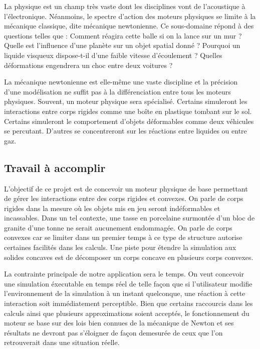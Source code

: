 La physique est un champ très vaste dont les disciplines vont de
l'acoustique à l'électronique. Néanmoins, le spectre d'action des
moteurs physiques se limite à la mécanique classique, dite mécanique
newtonienne. Ce sous-domaine répond à des questions telles que :
Comment réagira cette balle si on la lance sur un mur ? Quelle est
l'influence d'une planète sur un objet spatial donné ? Pourquoi un
liquide visqueux dispose-t-il d'une faible vitesse d'écoulement ?
Quelles déformations engendrera un choc entre deux voitures ?

La mécanique newtonienne est elle-même une vaste discipline et la
précision d'une modélisation ne suffit pas à la différenciation entre
tous les moteurs physiques. Souvent, un moteur physique sera
spécialisé. Certains simuleront les interactions entre corps rigides
comme une boîte en plastique tombant sur le sol. Certains simuleront
le comportement d'objets déformables comme deux véhicules se
percutant. D'autres se concentreront sur les réactions entre liquides
ou entre gaz.

\subsection{Travail à accomplir}

L'objectif de ce projet est de concevoir un moteur physique de base
permettant de gérer les interactions entre des corps rigides et
convexes. On parle de corps rigides dans la mesure o\`u les objets mis
en jeu seront indéformables et incassables. Dans un tel contexte, une
tasse en porcelaine surmontée d'un bloc de granite d'une tonne ne
serait aucunement endommagée. On parle de corps convexes car se
limiter dans un premier temps à ce type de structure autorise
certaines facilités dans les calculs. Une piste pour étendre la
simulation aux solides concaves est de décomposer un corps concave en
plusieurs corps convexes.

La contrainte principale de notre application sera le temps. On veut
concevoir une simulation éxecutable en temps réel de telle façon que
si l'utilisateur modifie l'environnement de la simulation à un instant
quelconque, une réaction à cette interaction soit immédiatement
perceptible. Bien que certains raccourcis dans les calculs ainsi que
plusieurs approximations soient acceptés, le fonctionnement du moteur
se base sur des lois bien connues de la mécanique de Newton et ses
résultats ne devront pas s'éloigner de façon demesurée de ceux que
l'on retrouverait dans une situation réelle.

